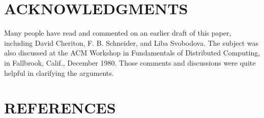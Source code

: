 \documentclass[a4paper,11pt,notitlepage,twoside,openright]{article}
\begin{document}
\hypertarget{acknowledgments}{%
\section*{ACKNOWLEDGMENTS}\label{acknowledgments}}

Many people have read and commented on an earlier draft of this paper,
including David Cheriton, F. B. Schneider, and Liba Svobodova. The
subject was also discussed at the ACM Workshop in Fundamentals of
Distributed Computing, in Fallbrook, Calif., December 1980. Those
comments and discussions were quite helpful in clarifying the arguments.

\hypertarget{references}{%
\section*{REFERENCES}\label{references}}
\end{document}
